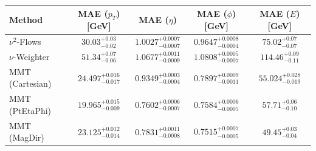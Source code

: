     \begin{tabular}{lcccc}
        \toprule
        Method & MAE ($p_T$) [GeV] & MAE ($\eta$) & MAE ($\phi$) [GeV] & MAE ($E$) [GeV] \\
        \midrule
        $\nu^2$-Flows & $30.03^{+0.03}_{-0.02}$ & $1.0027^{+0.0007}_{-0.0007}$ & $0.9647^{+0.0008}_{-0.0004}$ & $75.02^{+0.07}_{-0.07}$ \\
        $\nu$-Weighter & $51.34^{+0.07}_{-0.06}$ & $1.0677^{+0.0011}_{-0.0009}$ & $1.0808^{+0.0005}_{-0.0007}$ & $114.46^{+0.09}_{-0.11}$ \\
        MMT (Cartesian) & $24.497^{+0.016}_{-0.017}$ & $0.9349^{+0.0003}_{-0.0004}$ & $0.7897^{+0.0009}_{-0.0011}$ & $55.024^{+0.028}_{-0.019}$ \\
        MMT (PtEtaPhi) & $19.965^{+0.015}_{-0.009}$ & $0.7602^{+0.0006}_{-0.0007}$ & $0.7584^{+0.0006}_{-0.0005}$ & $57.71^{+0.06}_{-0.10}$ \\
        MMT (MagDir) & $23.125^{+0.012}_{-0.014}$ & $0.7831^{+0.0011}_{-0.0008}$ & $0.7515^{+0.0007}_{-0.0005}$ & $49.45^{+0.03}_{-0.04}$ \\
        \bottomrule
    \end{tabular}